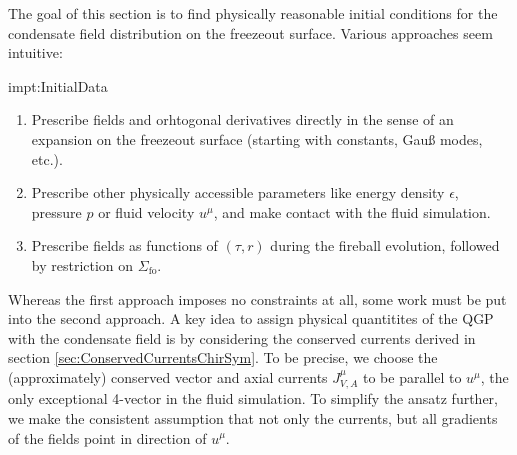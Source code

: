 The goal of this section is to find physically reasonable initial conditions for the condensate field distribution on the freezeout surface. Various approaches seem intuitive:
\begin{impt}{impt:InitialData}
\begin{enumerate}
    \item Prescribe fields and orhtogonal derivatives directly in the sense of an expansion on the freezeout surface (starting with constants, Gauß modes, etc.).
    \item Prescribe other physically accessible parameters like energy density $\epsilon$, pressure $p$ or fluid velocity $u^\mu$, and make contact with the fluid simulation.
    \item Prescribe fields as functions of $(\tau,r)$ during the fireball evolution, followed by restriction on $\Sigma_{\text{fo}}$.
\end{enumerate}
\end{impt}
Whereas the first approach imposes no constraints at all, some work must be put into the second approach. A key idea to assign physical quantitites of the QGP with the condensate field is by considering the conserved currents derived in section \ref{sec:ConservedCurrentsChirSym}. To be precise, we choose the (approximately) conserved vector and axial currents $J^\mu_{V,A}$ to be parallel to $u^\mu$, the only exceptional 4-vector in the fluid simulation. To simplify the ansatz further, we make the consistent assumption that not only the currents, but all gradients of the fields point in direction of $u^\mu$.

